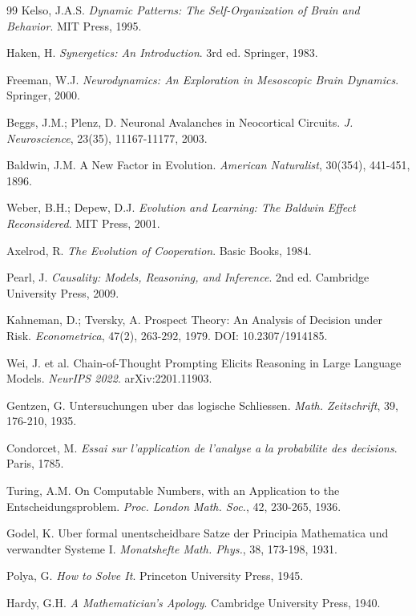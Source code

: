 \documentclass[5p]{elsarticle}
\begin{document}
\begin{thebibliography}{99}
Kelso, J.A.S. \textit{Dynamic Patterns: The Self-Organization of Brain and
Behavior}. MIT Press, 1995.

Haken, H. \textit{Synergetics: An Introduction}. 3rd ed. Springer, 1983.

Freeman, W.J. \textit{Neurodynamics: An Exploration in Mesoscopic Brain
Dynamics}. Springer, 2000.

Beggs, J.M.; Plenz, D. Neuronal Avalanches in Neocortical Circuits.
\textit{J. Neuroscience}, 23(35), 11167-11177, 2003.

Baldwin, J.M. A New Factor in Evolution. \textit{American Naturalist},
30(354), 441-451, 1896.

Weber, B.H.; Depew, D.J. \textit{Evolution and Learning: The Baldwin Effect
Reconsidered}. MIT Press, 2001.

Axelrod, R. \textit{The Evolution of Cooperation}. Basic Books, 1984.

Pearl, J. \textit{Causality: Models, Reasoning, and Inference}. 2nd ed.
Cambridge University Press, 2009.

Kahneman, D.; Tversky, A. Prospect Theory: An Analysis of Decision under
Risk. \textit{Econometrica}, 47(2), 263-292, 1979. DOI: 10.2307/1914185.

Wei, J. et al. Chain-of-Thought Prompting Elicits Reasoning in Large Language
Models. \textit{NeurIPS 2022}. arXiv:2201.11903.

Gentzen, G. Untersuchungen uber das logische Schliessen. \textit{Math.
Zeitschrift}, 39, 176-210, 1935.

Condorcet, M. \textit{Essai sur l'application de l'analyse a la probabilite
des decisions}. Paris, 1785.

Turing, A.M. On Computable Numbers, with an Application to the
Entscheidungsproblem. \textit{Proc. London Math. Soc.}, 42, 230-265, 1936.

Godel, K. Uber formal unentscheidbare Satze der Principia Mathematica und
verwandter Systeme I. \textit{Monatshefte Math. Phys.}, 38, 173-198, 1931.

Polya, G. \textit{How to Solve It}. Princeton University Press, 1945.

Hardy, G.H. \textit{A Mathematician's Apology}. Cambridge University Press,
1940.


\end{thebibliography}
\end{document}
